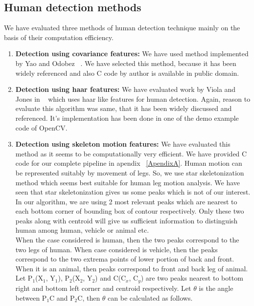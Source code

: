 \subsection{Human detection methods}

We have evaluated three methods of human detection technique mainly on the
basis of their computation efficiency.
\begin{enumerate}
\item \textbf{Detection using covariance features:} We have used method
implemented by Yao and Odobez ~\cite{19}. We have selected this method,
because it has been widely referenced and also C code by author is
available in public domain.\\
\item \textbf{Detection using haar features:} We have evaluated work by
Viola and Jones in ~\cite{16, 17} which uses haar like features for
human detection. Again, reason to evaluate this algorithm was same, that
it has been widely discussed and referenced. It's implementation has
been done in one of the demo example code of OpenCV.\\
\item \textbf{Detection using skeleton motion features:} We have
evaluated this method as it seems to be computationally very efficient.
We have provided C code for our complete pipeline in apendix
~\ref{ApendixA}.  Human motion can be represented suitably by movement
of legs. So, we use star skeletonization method which seems best
suitable for human leg motion analysis. We have seen that star
skeletonization gives us some peaks which is not of our interest. In our
algorithm, we are using 2 most relevant peaks which are nearest to each
bottom corner of bounding box of contour respectively. Only these two
peaks along with centroid will give us sufficient information to
distinguish human among human, vehicle or animal etc.\\
\indent When the case considered is human, then the two peaks correspond to
the two legs of human. When case considered is vehicle, then the peaks
correspond to the two extrema points of lower portion of back and front.
When it is an animal, then peaks correspond to front and back leg of
animal.\\
\indent Let P$_1$(X$_1$, Y$_1$), P$_2$(X$_2$, Y$_2$) and C(C$_x$, C$_y$)
are two peaks nearest to bottom right and bottom left corner and
centroid respectively. Let $\theta$ is the angle between P$_1$C and
P$_2$C, then $\theta$ can be calculated as follows.\\

\end{enumerate}
